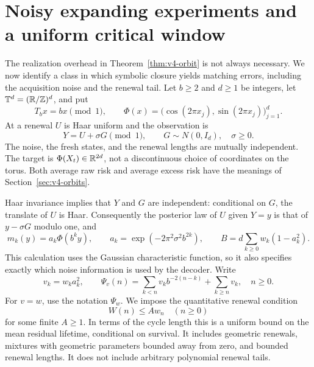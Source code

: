 \section{Noisy expanding experiments and a uniform critical window}\label{sec:v4-expanding}

The realization overhead in Theorem~\ref{thm:v4-orbit} is not always
necessary. We now identify a class in which symbolic closure yields
matching errors, including the acquisition noise and the renewal tail.
Let $b\ge2$ and $d\ge1$ be integers, let $\mathbb T^d=(\mathbb R/\mathbb Z)^d$,
and put
\begin{equation}
 T_bx=bx\pmod1,\qquad
 \Phi(x)=\bigl(\cos(2\pi x_j),\sin(2\pi x_j)\bigr)_{j=1}^d.
                                                               \label{eq:v4-torus-readout}
\end{equation}
At a renewal $U$ is Haar uniform and the observation is
\begin{equation}
 Y=U+\sigma G\pmod1,\qquad G\sim N(0,I_d),\quad \sigma\ge0.
                                                               \label{eq:v4-wrapped-acquisition}
\end{equation}
The noise, the fresh states, and the renewal lengths are mutually
independent. The target is $\Phi(X_t)\in\mathbb R^{2d}$, not a discontinuous
choice of coordinates on the torus. Both average raw risk and average
excess risk have the meanings of Section~\ref{sec:v4-orbits}.

Haar invariance implies that $Y$ and $G$ are independent: conditional
on $G$, the translate of $U$ is Haar. Consequently the posterior law
of $U$ given $Y=y$ is that of $y-\sigma G$ modulo one, and
\begin{equation}
 m_k(y)=a_k\Phi(b^ky),\qquad
 a_k=\exp(-2\pi^2\sigma^2b^{2k}),\qquad
 B=d\sum_{k\ge0}w_k(1-a_k^2).                                  \label{eq:v4-explicit-posterior}
\end{equation}
This calculation uses the Gaussian characteristic function, so it
also specifies exactly which noise information is used by the decoder.
Write
\begin{equation}
 v_k=w_ka_k^2,\qquad
 \Psi_v(n)=\sum_{k<n}v_k b^{-2(n-k)}+\sum_{k\ge n}v_k,
 \quad n\ge0.                                                   \label{eq:v4-profile}
\end{equation}
For $v=w$, use the notation $\Psi_w$.
We impose the quantitative renewal condition
\begin{equation}
 W(n)\le A w_n\quad(n\ge0)                                     \label{eq:v4-residual-life}
\end{equation}
for some finite $A\ge1$. In terms of the cycle length this is a
uniform bound on the mean residual lifetime, conditional on survival.
It includes geometric renewals, mixtures with geometric parameters
bounded away from zero, and bounded renewal lengths. It does not
include arbitrary polynomial renewal tails.


